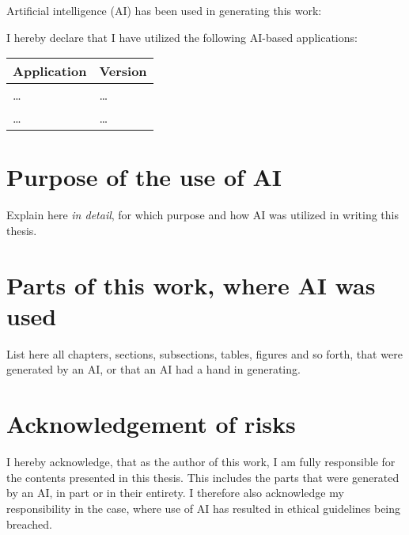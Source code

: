 Artificial intelligence (AI) has been used in generating this work:

\yestoai %

I hereby declare that I have utilized the following AI-based applications:

\begin{center}
    \begin{tabularx}{\linewidth}{X|l}
        \toprule
        \textbf{Application} & \textbf{Version} \\
        \midrule
        \dots & \dots \\
        \dots & \dots \\
        \bottomrule
    \end{tabularx}
\end{center}

\section*{Purpose of the use of AI}

Explain here \emph{in detail}, for which purpose and how AI was utilized in writing this thesis.

\section*{Parts of this work,  where AI was used}

List here all chapters, sections, subsections, tables, figures and so forth,
that were generated by an AI, or that an AI had a hand in generating.

\section*{Acknowledgement of risks}

I hereby acknowledge, that as the author of this work, I am fully responsible
for the contents presented in this thesis. This includes the parts that were
generated by an AI, in part or in their entirety. I therefore also acknowledge
my responsibility in the case, where use of AI has resulted in ethical
guidelines being breached.
